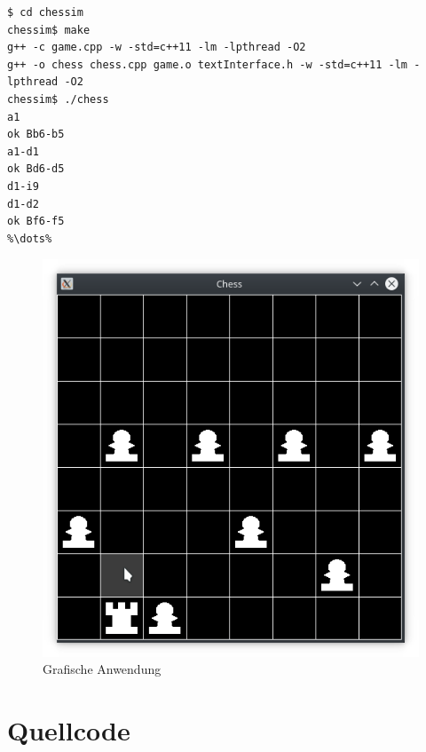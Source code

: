 \documentclass[a4paper, 11pt]{scrartcl}
\begin{document}
\begin{lstlisting}[escapechar=\%]
$ cd chessim
chessim$ make
g++ -c game.cpp -w -std=c++11 -lm -lpthread -O2
g++ -o chess chess.cpp game.o textInterface.h -w -std=c++11 -lm -lpthread -O2
chessim$ ./chess
a1
ok Bb6-b5
a1-d1
ok Bd6-d5
d1-i9
d1-d2
ok Bf6-f5
%\dots%
\end{lstlisting}
\begin{figure}[H]
	\centering
	\includegraphics[width=\textwidth]{screenshot}
	\caption{Grafische Anwendung}
\end{figure}

\newpage
\section*{Quellcode}








\end{document}
